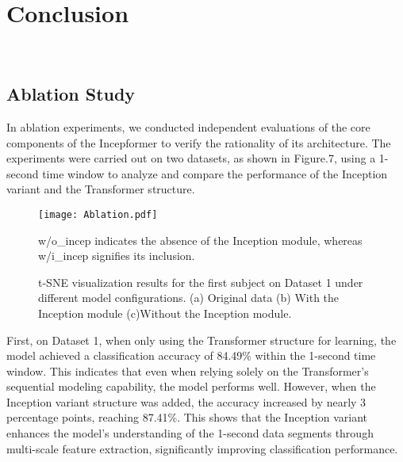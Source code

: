 \documentclass[10pt]{iopart}
\begin{document}
\section{Conclusion}


‌\subsection{Ablation Study}



In ablation experiments, we conducted independent evaluations of the core components of the Incepformer to verify the rationality of its architecture. The experiments were carried out on two datasets, as shown in Figure.7, using a 1-second time window to analyze and compare the performance of the Inception variant and the Transformer structure\cite{ravi2022enhanced}.

\begin{figure}[]
    \centering
    \texttt{[image: Ablation.pdf]}
    \caption{w/o\_incep indicates the absence of the Inception module, whereas w/i\_incep signifies its inclusion.}
\end{figure}

\begin{figure*}[]
    \centering
    \caption{t-SNE visualization results for the first subject on Dataset 1 under different model configurations. (a) Original data (b) With the Inception module (c)Without the Inception module.}
\end{figure*}

First, on Dataset 1, when only using the Transformer structure for learning, the model achieved a classification accuracy of 84.49\% within the 1-second time window. This indicates that even when relying solely on the Transformer’s sequential modeling capability, the model performs well. However, when the Inception variant structure was added, the accuracy increased by nearly 3 percentage points, reaching 87.41\%. This shows that the Inception variant enhances the model's understanding of the 1-second data segments through multi-scale feature extraction, significantly improving classification performance.
\end{document}
